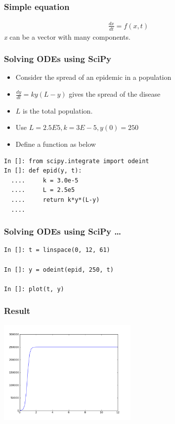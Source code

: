\documentclass[14pt,compress]{beamer}
\begin{document}
\begin{frame}
  \frametitle{Simple equation}
\begin{align}
    \frac{dx}{dt} = f(x, t)
\end{align}
\emph{x} can be a vector with many components.
\end{frame}


\begin{frame}[fragile]
\frametitle{Solving ODEs using SciPy}
\begin{itemize}
\item Consider the spread of an epidemic in a population
\item $\frac{dy}{dt} = ky(L-y)$ gives the spread of the disease
\item $L$ is the total population.
\item Use $L = 2.5E5, k = 3E-5, y(0) = 250$
\item Define a function as below
\end{itemize}
\small
\begin{lstlisting}
In []: from scipy.integrate import odeint
In []: def epid(y, t):
  ....     k = 3.0e-5
  ....     L = 2.5e5
  ....     return k*y*(L-y)
  ....
\end{lstlisting}
\end{frame}

\begin{frame}[fragile]
\frametitle{Solving ODEs using SciPy \ldots}
\begin{lstlisting}
In []: t = linspace(0, 12, 61)

In []: y = odeint(epid, 250, t)

In []: plot(t, y)
\end{lstlisting}
\end{frame}

\begin{frame}[fragile]
\frametitle{Result}
\begin{center}
    \includegraphics[height=2in, interpolate=true]{images/population_ode}
\end{center}
\end{frame}
\end{document}
